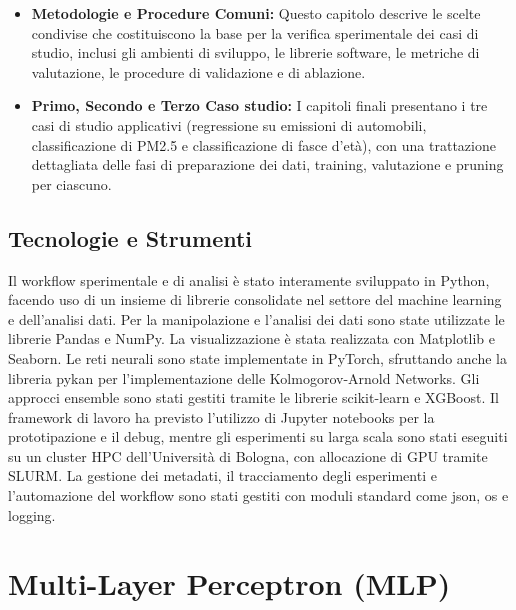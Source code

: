 \documentclass[a4paper,12pt]{report}
\begin{document}
\begin{itemize}[leftmargin=*]
		\item \textbf{Metodologie e Procedure Comuni:} Questo capitolo descrive le scelte condivise che costituiscono la base per la verifica sperimentale dei casi di studio, inclusi gli ambienti di sviluppo, le librerie software, le metriche di valutazione, le procedure di validazione e di ablazione.
		\item \textbf{Primo, Secondo e Terzo Caso studio:} I capitoli finali presentano i tre casi di studio applicativi (regressione su emissioni di automobili, classificazione di PM2.5 e classificazione di fasce d'età), con una trattazione dettagliata delle fasi di preparazione dei dati, training, valutazione e pruning per ciascuno.
	\end{itemize}
	
	\section*{Tecnologie e Strumenti}
	Il workflow sperimentale e di analisi è stato interamente sviluppato in Python, facendo uso di un insieme di librerie consolidate nel settore del machine learning e dell'analisi dati. Per la manipolazione e l'analisi dei dati sono state utilizzate le librerie Pandas e NumPy. La visualizzazione è stata realizzata con Matplotlib e Seaborn. Le reti neurali sono state implementate in PyTorch, sfruttando anche la libreria pykan per l'implementazione delle Kolmogorov-Arnold Networks. Gli approcci ensemble sono stati gestiti tramite le librerie scikit-learn e XGBoost. Il framework di lavoro ha previsto l'utilizzo di Jupyter notebooks per la prototipazione e il debug, mentre gli esperimenti su larga scala sono stati eseguiti su un cluster HPC dell'Università di Bologna, con allocazione di GPU tramite SLURM. La gestione dei metadati, il tracciamento degli esperimenti e l'automazione del workflow sono stati gestiti con moduli standard come json, os e logging.
	
	\chapter{Multi-Layer Perceptron (MLP)}
	
\end{document}
